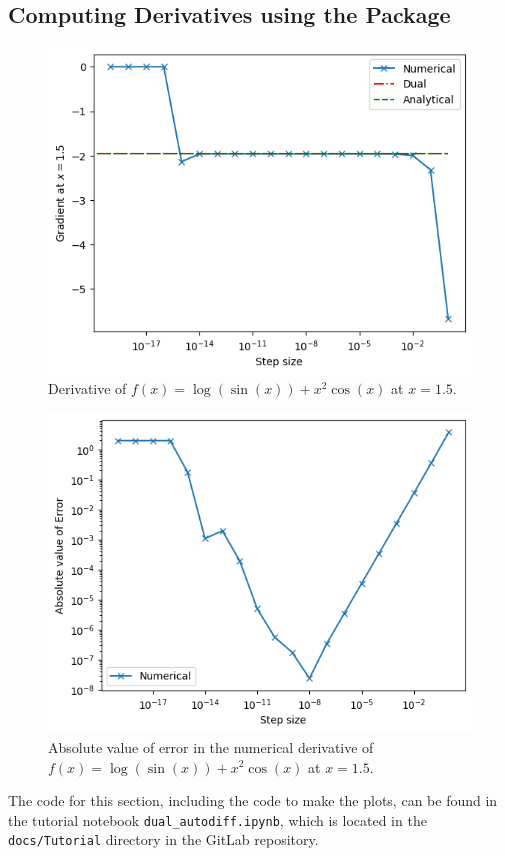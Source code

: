 \documentclass{article}
\begin{document}
\subsection{ Computing Derivatives using the Package } \label{compderivs}

\begin{figure}[h!]
    \centering
    \includegraphics[width=0.7\linewidth]{q5_derivative.png}
    \caption{Derivative of \(f(x) = \log(\sin(x)) +x^2 \cos(x)\) at \(x=1.5\).}
    \label{fig:q5_derivative}
\end{figure}

\begin{figure}[h!]
    \centering
    \includegraphics[width=0.7\linewidth]{q5_error.png}
    \caption{Absolute value of error in the numerical derivative of \(f(x) = \log(\sin(x)) +x^2 \cos(x)\) at \(x=1.5\). }
    \label{fig:q5_error}
\end{figure}

The code for this section, including the code to make the plots, can be found in the tutorial notebook \texttt{dual\_autodiff.ipynb}, which is located in the \texttt{docs/Tutorial} directory in the GitLab repository.
\end{document}

